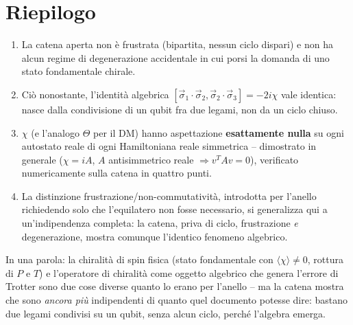 \documentclass[11pt,a4paper]{article}
\begin{document}
\section{Riepilogo}

\begin{enumerate}[leftmargin=1.4em,itemsep=0.3em]
\item La catena aperta non è frustrata (bipartita, nessun ciclo dispari) e
non ha alcun regime di degenerazione accidentale in cui porsi la domanda
di uno stato fondamentale chirale.
\item Ciò nonostante, l'identità algebrica
$[\vec\sigma_1\!\cdot\!\vec\sigma_2,\vec\sigma_2\!\cdot\!\vec\sigma_3]=-2i\chi$
vale identica: nasce dalla condivisione di un qubit fra due legami, non
da un ciclo chiuso.
\item $\chi$ (e l'analogo $\Theta$ per il DM) hanno aspettazione
\textbf{esattamente nulla} su ogni autostato reale di ogni Hamiltoniana
reale simmetrica -- dimostrato in generale ($\chi=iA$, $A$ antisimmetrico
reale $\Rightarrow v^TAv=0$), verificato numericamente sulla catena in
quattro punti.
\item La distinzione frustrazione/non-commutatività, introdotta per
l'anello richiedendo solo che l'equilatero non fosse necessario, si
generalizza qui a un'indipendenza completa: la catena, priva di ciclo,
frustrazione \emph{e} degenerazione, mostra comunque l'identico fenomeno
algebrico.
\end{enumerate}

\begin{editnote}
In una parola: la chiralità di spin fisica (stato fondamentale con
$\langle\chi\rangle\neq0$, rottura di $P$ e $T$) e l'operatore di
chiralità come oggetto algebrico che genera l'errore di Trotter sono due
cose diverse quanto lo erano per l'anello -- ma la catena mostra che sono
\emph{ancora più} indipendenti di quanto quel documento potesse dire:
bastano due legami condivisi su un qubit, senza alcun ciclo, perché
l'algebra emerga.
\end{editnote}
\end{document}
